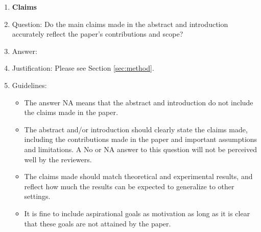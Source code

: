 \documentclass{article}
\begin{document}
\begin{enumerate}

\item {\bf Claims}
    \item[] Question: Do the main claims made in the abstract and introduction accurately reflect the paper's contributions and scope?
    \item[] Answer: \answerYes{} %
    \item[] Justification: Please see Section \ref{sec:method}.
    \item[] Guidelines:
    \begin{itemize}
        \item The answer NA means that the abstract and introduction do not include the claims made in the paper.
        \item The abstract and/or introduction should clearly state the claims made, including the contributions made in the paper and important assumptions and limitations. A No or NA answer to this question will not be perceived well by the reviewers. 
        \item The claims made should match theoretical and experimental results, and reflect how much the results can be expected to generalize to other settings. 
        \item It is fine to include aspirational goals as motivation as long as it is clear that these goals are not attained by the paper. 
    \end{itemize}


\end{enumerate}
\end{document}
